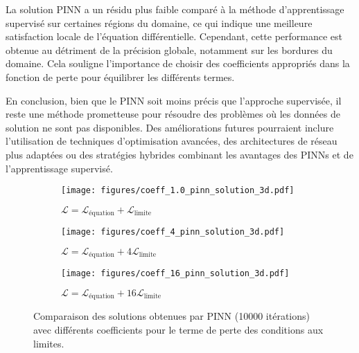 \documentclass[11pt,a4paper]{article}
\begin{document}
La solution PINN a un résidu plus faible comparé à la méthode d'apprentissage supervisé sur certaines régions du domaine, ce qui indique une meilleure satisfaction locale de l'équation différentielle. Cependant, cette performance est obtenue au détriment de la précision globale, notamment sur les bordures du domaine. Cela souligne l'importance de choisir des coefficients appropriés dans la fonction de perte pour équilibrer les différents termes.
\vspace{1em}

En conclusion, bien que le PINN soit moins précis que l'approche supervisée, il reste une méthode prometteuse pour résoudre des problèmes où les données de solution ne sont pas disponibles. Des améliorations futures pourraient inclure l'utilisation de techniques d'optimisation avancées, des architectures de réseau plus adaptées ou des stratégies hybrides combinant les avantages des PINNs et de l'apprentissage supervisé.
\vspace{1em}


\begin{figure}[H]
    \centering
    \begin{subfigure}{0.3\textwidth}
        \texttt{[image: figures/coeff\_1.0\_pinn\_solution\_3d.pdf]}
        \caption{$\mathcal{L} = \mathcal{L}_\text{équation} + \mathcal{L}_\text{limite}$}
    \end{subfigure}
    \begin{subfigure}{0.3\textwidth}
        \texttt{[image: figures/coeff\_4\_pinn\_solution\_3d.pdf]}
        \caption{$\mathcal{L} = \mathcal{L}_\text{équation} + 4\mathcal{L}_\text{limite}$}
    \end{subfigure}
    \begin{subfigure}{0.3\textwidth}
        \texttt{[image: figures/coeff\_16\_pinn\_solution\_3d.pdf]}
        \caption{$\mathcal{L} = \mathcal{L}_\text{équation} + 16\mathcal{L}_\text{limite}$}
    \end{subfigure}
    \caption{Comparaison des solutions obtenues par PINN (10000 itérations) avec différents coefficients pour le terme de perte des conditions aux limites.}
    \label{fig:coef_exp}
\end{figure}
\end{document}
